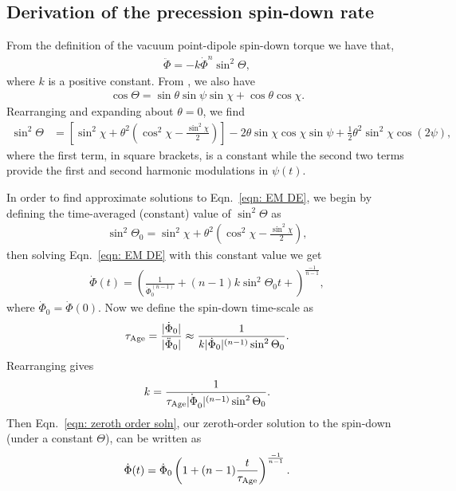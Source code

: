\documentclass[../full_thesis/full_thesis.tex]{subfiles}
\begin{document}
\begin{subappendices}
\section{Derivation of the precession spin-down rate}
\label{sec: derivation of spin-down rate}
From the definition of the vacuum point-dipole spin-down torque we have that,
\begin{align}
\ddot{\Phi} = -k \dot{\Phi}^{n} \sin^{2}\Theta,
\label{eqn: EM DE}
\end{align}
where $k$ is a positive constant. From \citet{Jones2001}, we also have
\begin{align}
\cos\Theta = \sin\theta \sin \psi \sin \chi + \cos\theta \cos\chi.
\end{align}
Rearranging and expanding about $\theta = 0$, we find
\begin{align}
\sin^{2}\Theta & =
\left[
\sin^{2}\chi + \theta^{2}\left(\cos^{2}\chi - \frac{\sin^{2}\chi}{2}\right)
\right]
- 2\theta \sin\chi\cos\chi \sin\psi
 + \frac{1}{2}\theta^{2}\sin^{2}\chi\cos(2\psi),
\label{eqn: sin 2 Theta}
\end{align}
where the first term, in square brackets, is a constant while the second two
terms provide the first and second harmonic modulations in $\psi(t)$.

In order to find approximate solutions to Eqn.~\eqref{eqn: EM DE}, we begin by
defining the time-averaged (constant) value of $\sin^{2}\Theta$ as
\begin{align}
\sin^{2}\Theta_0 =
\sin^{2}\chi + \theta^{2}\left(\cos^{2}\chi - \frac{\sin^{2}\chi}{2}\right),
\label{eqn: sin2Theta0}
\end{align}
then solving Eqn.~\eqref{eqn: EM DE} with this constant value we get
\begin{align}
\dot{\Phi}(t) = \left(\frac{1}{\dot{\Phi}_0^{(n-1)}}
                      + (n-1)k\sin^{2}\Theta_0 t + \right)^{\frac{-1}{n-1}},
\label{eqn: zeroth order soln}
\end{align}
where $\dot{\Phi}_0 = \dot{\Phi}(0)$. Now we define the spin-down time-scale as
\begin{align}
\tau_{\mathrm{Age}} = \frac{|\dot{\Phi}_0|}{|\ddot{\Phi}_0|}
\approx \frac{1}{k|\dot{\Phi}_0|^{(n-1)} \sin^{2}\Theta_0}.
\end{align}
Rearranging gives
\begin{align}
k = \frac{1}{\tau_{\mathrm{Age}} \dot{|\Phi}_0|^{(n-1)} \sin^{2}\Theta_0}.
\end{align}
Then Eqn.~\eqref{eqn: zeroth order soln}, our zeroth-order solution to the
spin-down (under a constant $\Theta$), can be written as
\begin{align}
\dot{\Phi}(t) = \dot{\Phi}_0\left(1 + (n-1)\frac{t}{\tau_{\mathrm{Age}}}\right)^{\frac{-1}{n-1}}.
\label{eqn: zeroth order soln complete}
\end{align}


\end{subappendices}
\end{document}
